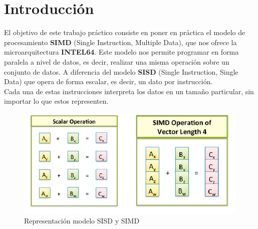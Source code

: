 \documentclass[a4paper]{article}
\begin{document}
\thispagestyle{empty}
\hspace{20cm}


\maketitle
\newpage


\thispagestyle{empty}
\vspace{3cm}
\tableofcontents
\newpage


\newpage

\section{Introducción}

El objetivo de este trabajo práctico consiste en poner en práctica el modelo de procesamiento \textbf{SIMD} (Single Instruction, Multiple Data), que nos ofrece la microarquitectura \textbf{INTEL64}. Este modelo nos permite programar en forma paralela a nivel de datos, es decir, realizar una misma operación sobre un conjunto de datos. A diferencia del modelo \textbf{SISD} (Single Instruction, Single Data) que opera de forma escalar, es decir, un dato por instrucción. \\
Cada una de estas instrucciones interpreta los datos en un tamaño particular, sin importar lo que estos representen. 

\begin{figure}[h]
  \begin{center}
	\includegraphics[scale=0.66]{img/simd.jpg}
	\caption{Representación modelo SISD y SIMD}
	\label{simd}
  \end{center}
\end{figure}
\end{document}

